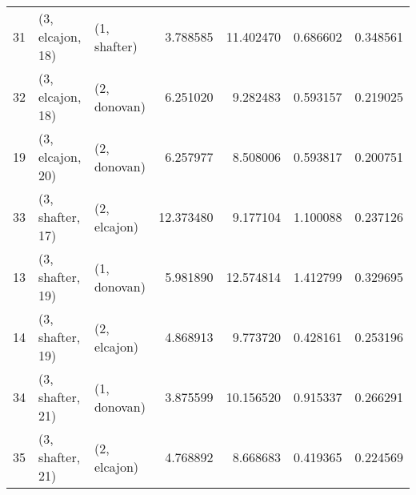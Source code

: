 \begin{tabular}{lllrrrr}
31 &  (3, elcajon, 18) &     (1, shafter) &   3.788585 &  11.402470 &   0.686602 &  0.348561 \\
32 &  (3, elcajon, 18) &     (2, donovan) &   6.251020 &   9.282483 &   0.593157 &  0.219025 \\
19 &  (3, elcajon, 20) &     (2, donovan) &   6.257977 &   8.508006 &   0.593817 &  0.200751 \\
33 &  (3, shafter, 17) &     (2, elcajon) &  12.373480 &   9.177104 &   1.100088 &  0.237126 \\
13 &  (3, shafter, 19) &     (1, donovan) &   5.981890 &  12.574814 &   1.412799 &  0.329695 \\
14 &  (3, shafter, 19) &     (2, elcajon) &   4.868913 &   9.773720 &   0.428161 &  0.253196 \\
34 &  (3, shafter, 21) &     (1, donovan) &   3.875599 &  10.156520 &   0.915337 &  0.266291 \\
35 &  (3, shafter, 21) &     (2, elcajon) &   4.768892 &   8.668683 &   0.419365 &  0.224569 \\
\bottomrule
\end{tabular}
